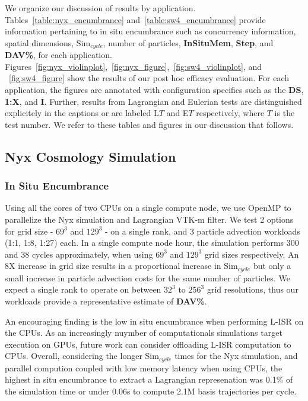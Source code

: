 We organize our discussion of results by application. 
%
Tables~\ref{table:nyx_encumbrance} and~\ref{table:sw4_encumbrance} provide information pertaining to in situ encumbrance such as concurrency information, spatial dimensions, Sim$_{cycle}$, number of particles, \textbf{InSituMem}, \textbf{Step}, and \textbf{DAV\%}, for each application. 
%
Figures~\ref{fig:nyx_violinplot},~\ref{fig:nyx_figure},~\ref{fig:sw4_violinplot}, and ~\ref{fig:sw4_figure} show the results of our post hoc efficacy evaluation.
%
For each application, the figures are annotated with configuration specifics such as the \textbf{DS}, \textbf{1:X}, and \textbf{I}.
%
Further, results from Lagrangian and Eulerian tests are distinguished explicitely in the captions or are labeled L$T$ and E$T$ respectively, where $T$ is the test number.
%
We refer to these tables and figures in our discussion that follows. 

\subsection{Nyx Cosmology Simulation}
\subsubsection{In Situ Encumbrance}
Using all the cores of two CPUs on a single compute node, we use OpenMP to parallelize the Nyx simulation and Lagrangian VTK-m filter.
%
We test 2 options for grid size - $69^{3}$ and $129^{3}$ - on a single rank, and 3 particle advection workloads (1:1, 1:8, 1:27) each.
%
In a single compute node hour, the simulation performs 300 and 38 cycles approximately, when using $69^{3}$ and $129^{3}$ grid sizes respectively.
%
%
An 8X increase in grid size results in a proportional increase in Sim$_{cycle}$ but only a small increase in particle advection costs for the same number of particles.
%
We expect a single rank to operate on between $32^{3}$ to $256^{3}$ grid resolutions, thus our workloads provide a representative estimate of \textbf{DAV\%}.
%

An encouraging finding is the low in situ encumbrance when performing L-ISR on the CPUs.
%
As an increasingly nuymber of computationals simulations target execution on GPUs, future work can consider offloading L-ISR computation to CPUs.
%
Overall, considering the longer Sim$_{cycle}$ times for the Nyx simulation, and parallel compution coupled with low memory latency when using CPUs, the highest in situ encumbrance to extract a Lagrangian represenation was 0.1\% of the simulation time or under 0.06s to compute 2.1M basis trajectories per cycle.




